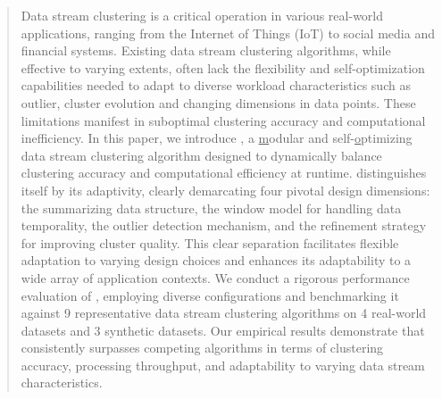 \begin{abstract} 
Data stream clustering is a critical operation in various real-world applications, ranging from the Internet of Things (IoT) to social media and financial systems. Existing data stream clustering algorithms, while effective to varying extents, often lack the flexibility and self-optimization capabilities needed to adapt to diverse workload characteristics such as outlier, cluster evolution and changing dimensions in data points. These limitations manifest in suboptimal clustering accuracy and computational inefficiency. In this paper, we introduce \algo, a \underline{m}odular and self-\underline{o}ptimizing data stream clustering algorithm designed to dynamically balance clustering accuracy and computational efficiency at runtime. \algo distinguishes itself by its adaptivity, clearly demarcating four pivotal design dimensions: the summarizing data structure, the window model for handling data temporality, the outlier detection mechanism, and the refinement strategy for improving cluster quality. This clear separation facilitates flexible adaptation to varying design choices and enhances its adaptability to a wide array of application contexts. We conduct a rigorous performance evaluation of \algo, employing diverse configurations and benchmarking it against 9 representative data stream clustering algorithms on 4 real-world datasets and 3 synthetic datasets. Our empirical results demonstrate that \algo consistently surpasses competing algorithms in terms of clustering accuracy, processing throughput, and adaptability to varying data stream characteristics. 
\end{abstract}